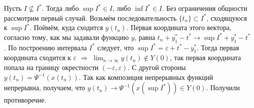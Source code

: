 \begin{enumerate}
    Пусть $I \nsubseteq I^*$. Тогда либо $\sup I^* \in I$, либо $\inf I^* \in I$. Без ограничения общности рассмотрим первый случай. Возьмём последовательность $\{t_n\} \subset I^*$, сходящуюся к $\sup I^*$. Поймём, куда сходится $y(t_n)$. Первая координата этого вектора, согласно тому, как мы задавали функцию $y$, равна $t_n + y_1^* - t^* \to \sup I^* + y_1^* - t^*$. По построению интервала $I^*$ следует, что $\sup I^* = \varepsilon + t^* - y_1^*$. Тогда первая координата сходится к $\varepsilon$ $\Rightarrow$ $\lim_{n\to\infty}y(t_n) \notin Y(0)$, так первая координата попала на границу окрестности $(-\varepsilon, \varepsilon)$.
    С другой стороны $y(t_n) = \Psi^{-1}(x(t_n))$. Так как композиция непрерывных функций непрерывна, получаем, что $y(t_n) \to \Psi^{-1}(x(\sup I^*)) \in Y(0)$. Получили противоречие.
\end{enumerate}

\QED






\pagebreak









